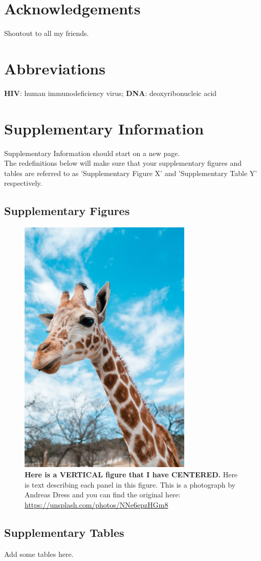 \documentclass{getwriting}
\begin{document}
\section*{Acknowledgements}
Shoutout to all my friends. 
\section*{Abbreviations}
\textbf{HIV}: human immunodeficiency virus; \textbf{DNA}: deoxyribonucleic acid
\newpage
\section*{Supplementary Information}
\label{suppinfo}
Supplementary Information should start on a new page. \\
The redefinitions below will make sure that your supplementary figures and tables are referred to as 'Supplementary Figure X' and 'Supplementary Table Y' respectively.
\setcounter{figure}{0}    
\renewcommand{\figurename}{Supplementary Figure }
\makeatletter
\def\fnum@figure{\figurename\thefigure}
\makeatother
\renewcommand{\tablename}{Supplementary Table }
\newpage
\subsection*{Supplementary Figures}
\begin{figure}[H]
\label{fig:supplementaryfigure1}
\begin{center}
\includegraphics[width=3.25in]{figures/supplementaryTest.jpg}
\end{center}
\caption{\textbf{Here is a VERTICAL figure that I have CENTERED.} Here is text describing each panel in this figure. This is a photograph by Andreas Dress and you can find the original here: \url{https://unsplash.com/photos/NNe6epzHGm8}}
\end{figure}
\newpage
\subsection*{Supplementary Tables}
Add some tables here.
\newpage

\end{document}
